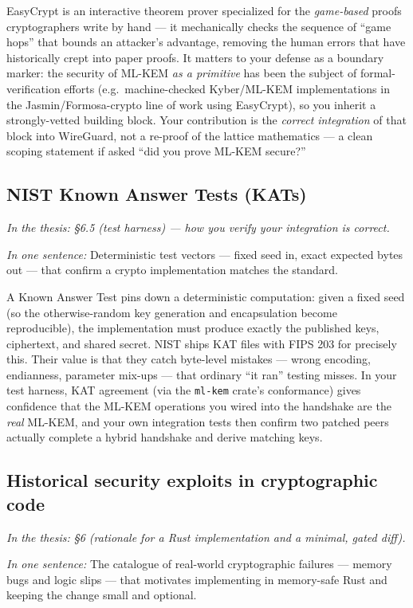 \documentclass[11pt]{article}
\newcommand{\seethesis}[1]{%
  {\small\color{softgray}\textit{In the thesis: #1}}\par\vspace{3pt}}
\newcommand{\nutshell}[1]{\noindent\textit{In one sentence:} #1\par\vspace{4pt}}
\begin{document}
EasyCrypt is an interactive theorem prover specialized for the \emph{game-based}
proofs cryptographers write by hand --- it mechanically checks the sequence of
``game hops'' that bounds an attacker's advantage, removing the human errors that
have historically crept into paper proofs. It matters to your defense as a
boundary marker: the security of ML-KEM \emph{as a primitive} has been the subject
of formal-verification efforts (e.g.\ machine-checked Kyber/ML-KEM
implementations in the Jasmin/Formosa-crypto line of work using EasyCrypt), so you
inherit a strongly-vetted building block. Your contribution is the \emph{correct
integration} of that block into WireGuard, not a re-proof of the lattice
mathematics --- a clean scoping statement if asked ``did you prove ML-KEM
secure?''

\subsection{NIST Known Answer Tests (KATs)}
\seethesis{\S6.5 (test harness) --- how you verify your integration is correct.}
\nutshell{Deterministic test vectors --- fixed seed in, exact expected bytes out
--- that confirm a crypto implementation matches the standard.}

A Known Answer Test pins down a deterministic computation: given a fixed seed (so
the otherwise-random key generation and encapsulation become reproducible), the
implementation must produce exactly the published keys, ciphertext, and shared
secret. NIST ships KAT files with FIPS 203 for precisely this. Their value is
that they catch byte-level mistakes --- wrong encoding, endianness, parameter
mix-ups --- that ordinary ``it ran'' testing misses. In your test harness, KAT
agreement (via the \texttt{ml-kem} crate's conformance) gives confidence that the
ML-KEM operations you wired into the handshake are the \emph{real} ML-KEM, and
your own integration tests then confirm two patched peers actually complete a
hybrid handshake and derive matching keys.

\subsection{Historical security exploits in cryptographic code}
\seethesis{\S6 (rationale for a Rust implementation and a minimal, gated diff).}
\nutshell{The catalogue of real-world cryptographic failures --- memory bugs and
logic slips --- that motivates implementing in memory-safe Rust and keeping the
change small and optional.}
\end{document}
